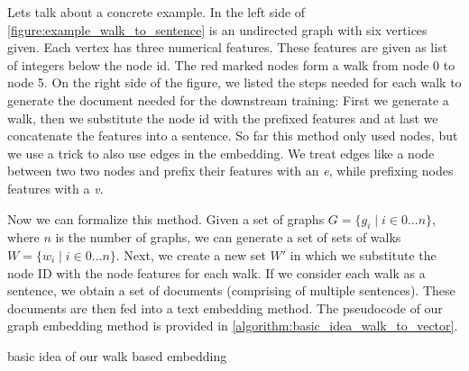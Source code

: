 Lets talk about a concrete example. In the left side of \autoref{figure:example_walk_to_sentence} is an undirected graph with six vertices given. Each vertex has three numerical features. These features are given as list of integers below the node id. The red marked nodes form a walk from node 0 to node 5. On the right side of the figure, we listed the steps needed for each walk to generate the document needed for the downstream training: First we generate a walk, then we substitute the node id with the prefixed features and at last we concatenate the features into a sentence. So far this method only used nodes, but we use a trick to also use edges in the embedding. We treat edges like a node between two two nodes and prefix their features with an \emph{e}, while prefixing nodes features with a \emph{v}.

Now we can formalize this method. Given a set of graphs $G = \{ g_i \mid i \in 0 \dots n \}$, where $n$ is the number of graphs, we can generate a set of sets of walks $W = \{ w_i \mid i \in 0 \dots n \}$. Next, we create a new set $W'$ in which we substitute the node ID with the node features for each walk. If we consider each walk as a sentence, we obtain a set of documents (comprising of multiple sentences). These documents are then fed into a text embedding method. The pseudocode of our graph embedding method is provided in \autoref{algorithm:basic_idea_walk_to_vector}.

\begin{minipage}{\linewidth}
    \begin{algorithm}[H]
        \DontPrintSemicolon



        \caption{basic idea of our walk based embedding}
        \label{algorithm:basic_idea_walk_to_vector}
    \end{algorithm}
\end{minipage}


